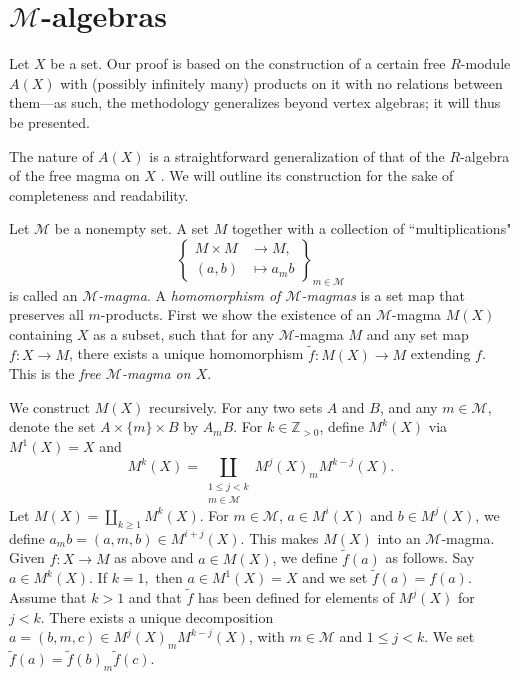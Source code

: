 \documentclass{article}
\theoremstyle{definition}
\def\Mu{\ensuremath{\mathcal{M}}}
\begin{document}
\section{$\Mu$-algebras} Let $X$ be a set. Our proof is based on the construction of a certain free $R$-module $A(X)$ with (possibly infinitely many)  products on it with  no relations between them---as such, the methodology generalizes beyond vertex algebras; it will thus be presented. 

The nature of $A(X)$ is a straightforward generalization of that of the $R$-algebra of the free magma on $X$ \cite[Ch. III \S2.6]{Bbk}. We will outline its construction for the sake of completeness and readability. 

Let $\Mu$  be a nonempty set.  A set $M$ together with a collection of ``multiplications"
\[ \left\{ \begin{aligned} M \times M &\to M, \\ (a,b) &\mapsto a_m b \end{aligned} \right\}_{m \in \Mu} \]
is called an \emph{$\Mu$-magma}. A {\it homomorphism of $\Mu$-magmas} is a set map that preserves all $m$-products. 
First we show the existence of an $\Mu$-magma $M(X)$ containing $X$ as a subset, such that for any $\Mu$-magma $M$ and any set map $f \colon X \to M$, there exists a unique homomorphism $\widetilde f \colon M(X) \to M$ extending $f$. This is the {\it free $\Mu$-magma on $X.$}

We  construct $M(X)$ recursively. For any two sets $A$ and $B$, and any $m \in \Mu$, denote the set $A \times \{ m \} \times B$ by $A_m B$. 
For $k \in \mathbb Z_{> 0}$, define $M^k(X)$ via $M^1(X) = X$ and 
\[ M^k(X) = \coprod_{\substack{ 1 \leq j < k \\ m \in \Mu}} M^j(X)_m M^{k-j}(X). \]
Let $M(X) = \coprod_{k \geq 1} M^k(X)$.
For $m \in \Mu$, $a \in M^i(X)$ and $b \in M^j(X)$, we define $a_m b = (a,m,b) \in M^{i+j}(X)$. 
This makes $M(X)$ into an $\Mu$-magma. Given $f \colon X \to M$ as above and $a \in M(X)$, we  define $\widetilde f(a)$ as follows. Say $a \in M^k(X).$ If $k = 1,$ then $a \in M^1(X) =X$ and we set $\widetilde f(a) = f(a).$ Assume that $k > 1$ and that $\widetilde{f}$ has been defined for elements of $M^j(X)$ for $j <k.$ There exists a unique decomposition $a = (b,m,c) \in M^j(X)_m M^{k-j}(X)$, with $m \in \Mu$ and $1 \leq j < k$. We set $\widetilde f(a) = \widetilde f(b)_m \widetilde f(c)$.
\end{document}
